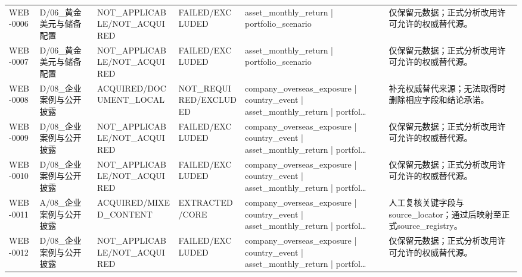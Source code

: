 \begin{landscape}
\begin{longtable}{p{1.8cm}p{2.6cm}p{2.6cm}p{2.6cm}p{4.8cm}p{7.2cm}}
WEB-0006 & D/\allowbreak{}06\_\allowbreak{}黄金美元与储备配置 & NOT\_\allowbreak{}APPLICABLE/\allowbreak{}NOT\_\allowbreak{}ACQUIRED & FAILED/\allowbreak{}EXCLUDED & asset\_\allowbreak{}monthly\_\allowbreak{}return | portfolio\_\allowbreak{}scenario & 仅保留元数据；正式分析改用许可允许的权威替代源。\\
WEB-0007 & D/\allowbreak{}06\_\allowbreak{}黄金美元与储备配置 & NOT\_\allowbreak{}APPLICABLE/\allowbreak{}NOT\_\allowbreak{}ACQUIRED & FAILED/\allowbreak{}EXCLUDED & asset\_\allowbreak{}monthly\_\allowbreak{}return | portfolio\_\allowbreak{}scenario & 仅保留元数据；正式分析改用许可允许的权威替代源。\\
WEB-0008 & D/\allowbreak{}08\_\allowbreak{}企业案例与公开披露 & ACQUIRED/\allowbreak{}DOCUMENT\_\allowbreak{}LOCAL & NOT\_\allowbreak{}REQUIRED/\allowbreak{}EXCLUDED & company\_\allowbreak{}overseas\_\allowbreak{}exposure | country\_\allowbreak{}event | asset\_\allowbreak{}monthly\_\allowbreak{}return | portfol… & 补充权威替代来源；无法取得时删除相应字段和结论承诺。\\
WEB-0009 & D/\allowbreak{}08\_\allowbreak{}企业案例与公开披露 & NOT\_\allowbreak{}APPLICABLE/\allowbreak{}NOT\_\allowbreak{}ACQUIRED & FAILED/\allowbreak{}EXCLUDED & company\_\allowbreak{}overseas\_\allowbreak{}exposure | country\_\allowbreak{}event | asset\_\allowbreak{}monthly\_\allowbreak{}return | portfol… & 仅保留元数据；正式分析改用许可允许的权威替代源。\\
WEB-0010 & D/\allowbreak{}08\_\allowbreak{}企业案例与公开披露 & NOT\_\allowbreak{}APPLICABLE/\allowbreak{}NOT\_\allowbreak{}ACQUIRED & FAILED/\allowbreak{}EXCLUDED & company\_\allowbreak{}overseas\_\allowbreak{}exposure | country\_\allowbreak{}event | asset\_\allowbreak{}monthly\_\allowbreak{}return | portfol… & 仅保留元数据；正式分析改用许可允许的权威替代源。\\
WEB-0011 & A/\allowbreak{}08\_\allowbreak{}企业案例与公开披露 & ACQUIRED/\allowbreak{}MIXED\_\allowbreak{}CONTENT & EXTRACTED/\allowbreak{}CORE & company\_\allowbreak{}overseas\_\allowbreak{}exposure | country\_\allowbreak{}event | asset\_\allowbreak{}monthly\_\allowbreak{}return | portfol… & 人工复核关键字段与source\_\allowbreak{}locator；通过后映射至正式source\_\allowbreak{}registry。\\
WEB-0012 & D/\allowbreak{}08\_\allowbreak{}企业案例与公开披露 & NOT\_\allowbreak{}APPLICABLE/\allowbreak{}NOT\_\allowbreak{}ACQUIRED & FAILED/\allowbreak{}EXCLUDED & company\_\allowbreak{}overseas\_\allowbreak{}exposure | country\_\allowbreak{}event | asset\_\allowbreak{}monthly\_\allowbreak{}return | portfol… & 仅保留元数据；正式分析改用许可允许的权威替代源。\\

\end{longtable}
\end{landscape}
